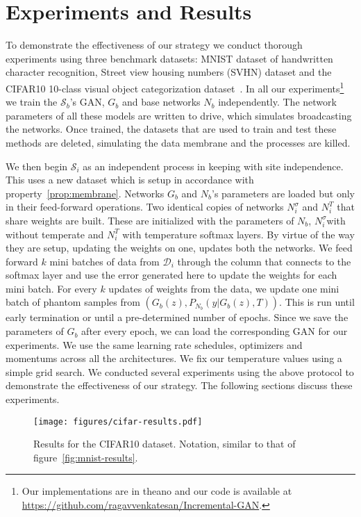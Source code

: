 \documentclass[10pt,twocolumn,letterpaper]{article}
\def \cS{{\mathcal{S}}}
\def \cD{{\mathcal{D}}}
\begin{document}
	\section{Experiments and Results}
	\label{sec:res}
	
	To demonstrate the effectiveness of our strategy we conduct thorough experiments using three benchmark datasets: MNIST dataset of handwritten character recognition, Street view housing numbers (SVHN) dataset and the CIFAR10 10-class visual object categorization dataset~\cite{mnist, netzer2011reading, krizhevsky2009learning}. 
	In all our experiments\footnote{Our implementations are in theano and our code is available at \url{https://github.com/ragavvenkatesan/Incremental-GAN}.} we train the $\cS_b$'s GAN, $G_b$ and base networks $N_b$ independently. 
	The network parameters of all these models are written to drive, which simulates broadcasting the networks.
	Once trained, the datasets that are used to train and test these methods are deleted, simulating the data membrane and the processes are killed. 
	
	We then begin $\cS_i$ as an independent process in keeping with site independence. 
	This uses a new dataset which is setup in accordance with property~\ref{prop:membrane}. 
	Networks $G_b$ and $N_b$'s parameters are loaded but only in their feed-forward operations. 
	Two identical copies of networks $N_i^\sigma$ and $N_i^T$ that share weights are built. 
	These are initialized with the parameters of $N_b$,  $N_i^\sigma$with without temperate and $N_i^T$ with temperature softmax layers. 
	By virtue of the way they are setup, updating the weights on one, updates both the networks. 
	We feed forward $k$ mini batches of data from $\cD_i$ through the column that connects to the softmax layer and use the error generated here to update the weights for each mini batch. 
	For every $k$ updates of weights from the data, we update one mini batch of phantom samples from $(G_b(z), P_{N_b}(y \vert G_b(z),T))$. 
	This is run until early termination or until a pre-determined number of epochs. 
	Since we save the parameters of $G_b$ after every epoch, we can load the corresponding GAN for our experiments. 
	We use the same learning rate schedules, optimizers and momentums across all the architectures.
	We fix our temperature values using a simple grid search.
	We conducted several experiments using the above protocol to demonstrate the effectiveness of our strategy.
	The following sections discuss these experiments. 
	
	\begin{figure}[t]
		\begin{center}
			\texttt{[image: figures/cifar-results.pdf]}
		\end{center}
		
		\caption{Results for the CIFAR10 dataset. Notation, similar to that of figure~\ref{fig:mnist-results}.}
		
		\label{fig:cifar-results}
	\end{figure}
	
\end{document}
